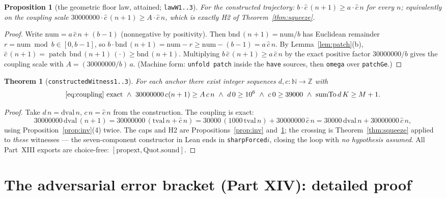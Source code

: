 \documentclass[11pt]{article}
\newcommand{\chat}{\widehat{c}}
\newcommand{\sumto}{\operatorname{sumTo}}
\newcommand{\patch}{\operatorname{patch}}
\theoremstyle{plain}
\newtheorem{proposition}[lemma]{Proposition}
\newtheorem{theorem}[lemma]{Theorem}
\theoremstyle{definition}
\begin{document}
\begin{proposition}[the geometric floor law, attained; \texttt{lawW1..3}]\label{prop:law}
For the constructed trajectory: $b\cdot\chat\,(n+1)\ge a\cdot\chat\,n$ for every $n$;
equivalently on the coupling scale $30000000\cdot\chat\,(n+1)\ge A\cdot\chat\,n$, which is
exactly H2 of Theorem~\ref{thm:squeeze}.
\end{proposition}
\begin{proof}
Write $\mathrm{num}=a\,\chat\,n+(b-1)$ (nonnegative by positivity). Then
$\mathrm{bnd}\,(n+1)=\mathrm{num}/b$ has Euclidean remainder
$r=\mathrm{num}\bmod b\in[0,b-1]$, so
$b\cdot\mathrm{bnd}\,(n+1)=\mathrm{num}-r\ge\mathrm{num}-(b-1)=a\,\chat\,n$.
By Lemma~\ref{lem:patch}(b), $\chat\,(n+1)=\patch\,\mathrm{bnd}\,(n+1)\,(\cdot)\ge
\mathrm{bnd}\,(n+1)$. Multiplying $b\,\chat\,(n+1)\ge a\,\chat\,n$ by the exact positive
factor $30000000/b$ gives the coupling scale with $A=(30000000/b)\,a$.
(Machine form: \texttt{unfold patch} inside the \texttt{have} sources, then
\texttt{omega} over \texttt{patchGe}.)
\end{proof}

\begin{theorem}[\texttt{constructedWitness1..3}]\label{thm:witness}
For each anchor there \emph{exist} integer sequences $d,c:\mathbb{N}\to\mathbb{Z}$ with
\[
\text{\eqref{eq:coupling} exact}\ \wedge\ 30000000\,c(n+1)\ge A\,c\,n\
\wedge\ d\,0\ge 10^{6}\ \wedge\ c\,0\ge 39000\ \wedge\ \sumto d\,K\ge M+1 .
\]
\end{theorem}
\begin{proof}
Take $d\,n=\mathrm{dval}\,n$, $c\,n=\chat\,n$ from the construction. The coupling is exact:
\[
30000000\,\mathrm{dval}\,(n+1)=30000000\,(\mathrm{tval}\,n+\chat\,n)
=30000\,(1000\,\mathrm{tval}\,n)+30000000\,\chat\,n
=30000\,\mathrm{dval}\,n+30000000\,\chat\,n,
\]
using Proposition~\ref{prop:inv}(4) twice. The caps and H2 are
Propositions~\ref{prop:inv} and~\ref{prop:law}; the crossing is Theorem~\ref{thm:squeeze}
applied to \emph{these} witnesses --- the seven-component constructor in Lean ends in
\texttt{sharpForced$i$}, closing the loop with \emph{no hypothesis assumed}. All Part~XIII
exports are choice-free: $[\mathrm{propext},\mathrm{Quot.sound}]$.
\end{proof}

\section{The adversarial error bracket (Part XIV): detailed proof}\label{sec:bracket}
\end{document}
